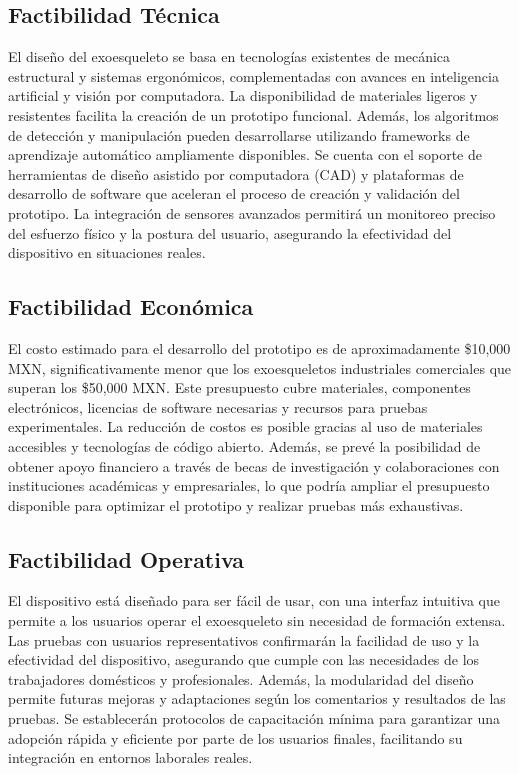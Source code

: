 \subsection{Factibilidad Técnica}
El diseño del exoesqueleto se basa en tecnologías existentes de mecánica estructural y sistemas ergonómicos, complementadas con avances en inteligencia artificial y visión por computadora. La disponibilidad de materiales ligeros y resistentes facilita la creación de un prototipo funcional. Además, los algoritmos de detección y manipulación pueden desarrollarse utilizando frameworks de aprendizaje automático ampliamente disponibles. Se cuenta con el soporte de herramientas de diseño asistido por computadora (CAD) y plataformas de desarrollo de software que aceleran el proceso de creación y validación del prototipo. La integración de sensores avanzados permitirá un monitoreo preciso del esfuerzo físico y la postura del usuario, asegurando la efectividad del dispositivo en situaciones reales.

\subsection{Factibilidad Económica}
El costo estimado para el desarrollo del prototipo es de aproximadamente \$10,000 MXN, significativamente menor que los exoesqueletos industriales comerciales que superan los \$50,000 MXN. Este presupuesto cubre materiales, componentes electrónicos, licencias de software necesarias y recursos para pruebas experimentales. La reducción de costos es posible gracias al uso de materiales accesibles y tecnologías de código abierto. Además, se prevé la posibilidad de obtener apoyo financiero a través de becas de investigación y colaboraciones con instituciones académicas y empresariales, lo que podría ampliar el presupuesto disponible para optimizar el prototipo y realizar pruebas más exhaustivas.

\subsection{Factibilidad Operativa}
El dispositivo está diseñado para ser fácil de usar, con una interfaz intuitiva que permite a los usuarios operar el exoesqueleto sin necesidad de formación extensa. Las pruebas con usuarios representativos confirmarán la facilidad de uso y la efectividad del dispositivo, asegurando que cumple con las necesidades de los trabajadores domésticos y profesionales. Además, la modularidad del diseño permite futuras mejoras y adaptaciones según los comentarios y resultados de las pruebas. Se establecerán protocolos de capacitación mínima para garantizar una adopción rápida y eficiente por parte de los usuarios finales, facilitando su integración en entornos laborales reales.

